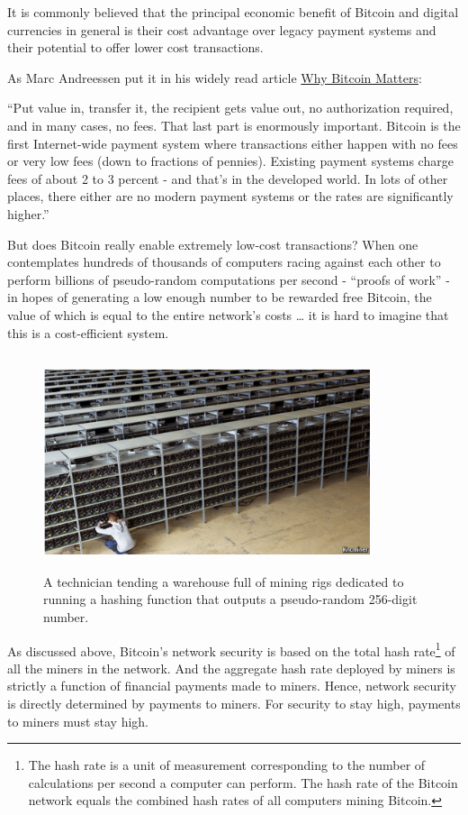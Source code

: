 \documentclass[a4paper,11pt]{article}
\begin{document}
It is commonly believed that the principal economic benefit of Bitcoin and digital currencies in general is their cost advantage over legacy payment systems and their potential to offer lower cost transactions.

As Marc Andreessen put it in his widely read article \href{http://dealbook.nytimes.com/2014/01/21/why-Bitcoin-matters/}{Why Bitcoin Matters}: 

``Put value in, transfer it, the recipient gets value out, no authorization required, and in many cases, no fees. That last part is enormously important. Bitcoin is the first Internet-wide payment system where transactions either happen with no fees or very low fees (down to fractions of pennies). Existing payment systems charge fees of about 2 to 3 percent - and that's in the developed world. In lots of other places, there either are no modern payment systems or the rates are significantly higher.''

But does Bitcoin really enable extremely low-cost transactions? When one contemplates hundreds of thousands of computers racing against each other to perform billions of pseudo-random computations per second - ``proofs of work'' - in hopes of generating a low enough number to be rewarded free Bitcoin, the value of which is equal to the entire network's costs … it is hard to imagine that this is a cost-efficient system.


\begin{figure}[H]
\centering
\includegraphics[width=96mm,height=63mm]{01_miners.png}
\caption{A technician tending a warehouse full of mining rigs dedicated to 
running a hashing function that outputs a pseudo-random 256-digit number.}
\end{figure}

As discussed above, Bitcoin's network security is based on the total hash rate\footnote{The hash rate is a unit of measurement corresponding to the number of calculations per second a computer can perform. The hash rate of the Bitcoin network equals the combined hash rates of all computers mining Bitcoin.} of all the miners in the network. And the aggregate hash rate deployed by miners is strictly a function of financial payments made to miners. Hence, network security is directly determined by payments to miners. For security to stay high, payments to miners must stay high.
\end{document}

